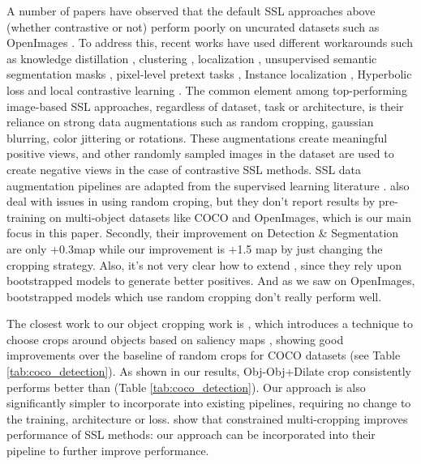 A number of papers have observed that the default SSL approaches above (whether contrastive or not) perform poorly on uncurated datasets such as OpenImages \cite{kuznetsova2020open}. To address this, recent works have used different workarounds such as knowledge distillation \cite{tian2021divide}, clustering \cite{goyal2021selfsupervised}, localization \cite{selvaraju2020casting}, unsupervised semantic segmentation masks \cite{henaff2021efficient}, pixel-level pretext tasks \cite{Xie2021PropagateYE}, Instance localization \cite{Yang2021InstanceLF}, Hyperbolic loss \cite{Ge2022HyperbolicCL} and local contrastive learning \cite{liu2021selfemd}. The common element among top-performing image-based SSL approaches, regardless of dataset, task or architecture, is their reliance on strong data augmentations such as random cropping, gaussian blurring, color jittering or rotations. These augmentations create meaningful positive views, and other randomly sampled images in the dataset are used to create negative views in the case of contrastive SSL methods. SSL data augmentation pipelines are adapted from the supervised learning literature \cite{cubuk2019autoaugment,zoph2020rethinking,NIPS2012_c399862d,2003aug,devries2017dataset,cubuk2019autoaugment,zhang2018mixup,wu2019detectron2,yun2019cutmix,lim2019fast,hataya2019faster}.   \cite{Chuang2022RobustCL,Peng2022CraftingBC} also deal with issues in using random croping, but they don’t report results by pre-training on multi-object datasets like COCO and OpenImages, which is our main focus in this paper. Secondly, their improvement on Detection \& Segmentation are only +0.3map while our improvement is +1.5 map by just changing the cropping strategy. Also, it’s not very clear how to extend \cite{Chuang2022RobustCL,Peng2022CraftingBC}, since they rely upon bootstrapped models to generate better positives. And as we saw on OpenImages, bootstrapped models which use random cropping don’t really perform well.

The closest work to our object cropping work is \cite{selvaraju2020casting}, which introduces a technique to choose crops around objects based on saliency maps \cite{Selvaraju2016GradCAMVE}, showing good improvements over the baseline of random crops for COCO datasets (see Table \ref{tab:coco_detection}). As shown in our results, Obj-Obj+Dilate crop consistently performs better than \cite{selvaraju2020casting} (Table \ref{tab:coco_detection}). Our approach is also significantly simpler to incorporate into existing pipelines, requiring no change to the training, architecture or loss. \citet{vangansbeke2021revisiting} show that constrained multi-cropping improves performance of SSL methods: our approach can be incorporated into their pipeline to further improve performance. 

